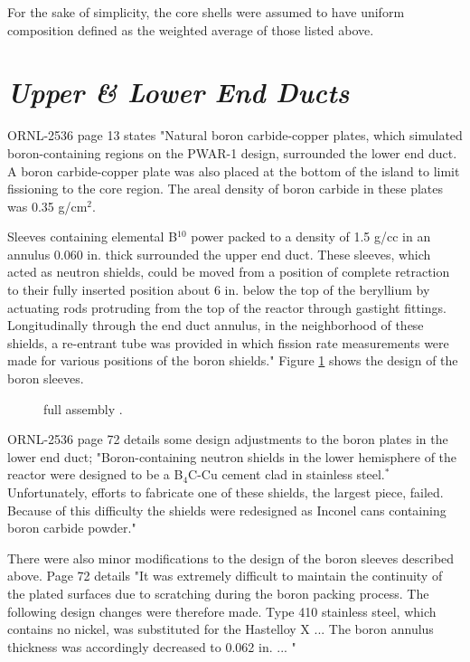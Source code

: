 \documentclass[ms,a4paper]{memoir}
\newcommand*{\msrarchive}{../../msr-archive}%
\begin{document}
For the sake of simplicity, the core shells were assumed to have uniform composition defined as the weighted average of those listed above.

\section{\emph{Upper \& Lower End Ducts}}

ORNL-2536 page 13 states "Natural boron carbide-copper plates, which simulated boron-containing regions on the PWAR-1 design, surrounded the lower end duct. A boron carbide-copper plate was also placed at the bottom of the island to limit fissioning to the core region. The areal density of boron carbide in these plates was 0.35 g/cm$^2$.

Sleeves containing elemental B$^{10}$ power packed to a density of 1.5 g/cc in an annulus 0.060 in. thick surrounded the upper end duct. These sleeves, which acted as neutron shields, could be moved from a position of complete retraction to their fully inserted position about 6 in. below the top of the beryllium by actuating rods protruding from the top of the reactor through gastight fittings. Longitudinally through the end duct annulus, in the neighborhood of these shields, a re-entrant tube was provided in which fission rate measurements were made for various positions of the boron shields." Figure \ref{fig14} shows the design of the boron sleeves.

\begin{figure}[H]
  \centering
  \caption{full assembly \parencite[]{ornl-2536}.}
  \label{fig14}
\end{figure}


ORNL-2536 page 72 details some design adjustments to the boron plates in the lower end duct; "Boron-containing neutron shields in the lower hemisphere of the reactor were designed to be a B$_4$C-Cu cement clad in stainless steel.$^*$ Unfortunately, efforts to fabricate one of these shields, the largest piece, failed. Because of this difficulty the shields were redesigned as Inconel cans containing boron carbide powder."

There were also minor modifications to the design of the boron sleeves described above. Page 72 details "It was extremely difficult to maintain the continuity of the plated surfaces due to scratching during the boron packing process. The following design changes were therefore made. Type 410 stainless steel, which contains no nickel, was substituted for the Hastelloy X ... The boron annulus thickness was accordingly decreased to 0.062 in. ... "
\end{document}
